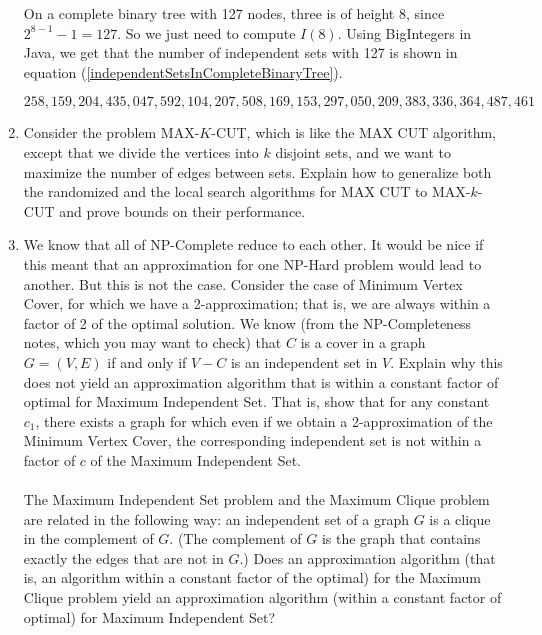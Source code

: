 \documentclass[tikz, 12pt]{scrartcl}
\begin{document}
\begin{enumerate}
On a complete binary tree with 127 nodes, three is of height 8, since $2^{8 - 1} - 1 = 127$. So we just need to compute $I(8)$. Using BigIntegers in Java, we get that the number of independent sets with 127 is shown in equation (\ref{independentSetsInCompleteBinaryTree}).

\begin{equation}\label{independentSetsInCompleteBinaryTree}
258,159,204,435,047,592,104,207,508,169,153,297,050,209,383,336,364,487,461
\end{equation}

	
	\item Consider the problem MAX-$K$-CUT, which is like the MAX CUT algorithm, except that we divide the vertices into $k$ disjoint sets, and we want to maximize the number of edges between sets. Explain how to generalize both the randomized and the local search algorithms for MAX CUT to MAX-$k$-CUT and prove bounds on their performance.
	
	\item We know that all of NP-Complete reduce to each other. It would be nice if this meant that an approximation for one NP-Hard problem would lead to another. But this is not the case. Consider the case of Minimum Vertex Cover, for which we have a 2-approximation; that is, we are always within a factor of 2 of the optimal solution. We know (from the NP-Completeness notes, which you may want to check) that $C$ is a cover in a graph $G = (V, E)$ if and only if $V - C$ is an independent set in $V$. Explain why this does not yield an approximation algorithm that is within a constant factor of optimal for Maximum Independent Set. That is, show that for any constant $c_1$, there exists a graph for which even if we obtain a 2-approximation of the Minimum Vertex Cover, the corresponding independent set is not within a factor of $c$ of the Maximum Independent Set.\\
	\\
	The Maximum Independent Set problem and the Maximum Clique problem are related in the following way: an independent set of a graph $G$ is a clique in the complement of $G$. (The complement of $G$ is the graph that contains exactly the edges that are not in $G$.) Does an approximation algorithm (that is, an algorithm within a constant factor of the optimal) for the Maximum Clique problem yield an approximation algorithm (within a constant factor of optimal) for Maximum Independent Set?
	

\end{enumerate}
\end{document}
